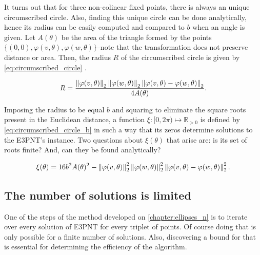 It turns out that for three non-colinear fixed points, there is always an unique circumscribed circle. Also, finding this unique circle can be done analytically, hence its radius can be easily computed and compared to $b$ when an angle is given.
Let $A(\theta)$ be the area of the triangle formed by the points $\{(0, 0), \varphi(v, \theta), \varphi(w, \theta)\}$--note that the transformation does not preserve distance or area. Then, the radius $R$ of the circumscribed circle is given by \autoref{eq:circumscribed_circle} \cite[p.~189]{johnson1960}.

\begin{equation}\label{eq:circumscribed_circle}
R = \dfrac{\left\lVert\varphi(v, \theta)\right\rVert_{2}\left\lVert\varphi(w, \theta)\right\rVert_{2}\left\lVert\varphi(v, \theta)-\varphi(w, \theta)\right\rVert_{2}   }{4A(\theta)}.
\end{equation}

Imposing the radius to be equal $b$ and squaring to eliminate the square roots present in the Euclidean distance, a function $\xi : [0, 2\pi) \mapsto \mathbb{R}_{>0}$ is defined by \autoref{eq:circumscribed_circle_b} in such a way that its zeros determine solutions to the E3PNT's instance. Two questions about $\xi(\theta)$ that arise are: is its set of roots finite? And, can they be found analytically?

\begin{equation}\label{eq:circumscribed_circle_b}
\xi(\theta) = 16b^2A(\theta)^2 - \left\lVert\varphi(v, \theta)\right\rVert_{2}^2\left\lVert\varphi(w, \theta)\right\rVert_{2}^2\left\lVert\varphi(v, \theta)-\varphi(w, \theta)\right\rVert_{2}^2.
\end{equation}

\subsection{The number of solutions is limited}

One of the steps of the method developed on \autoref{chapter:ellipses_n} is to iterate over every solution of E3PNT for every triplet of points. Of course doing that is only possible for a finite number of solutions. Also, discovering a bound for that is essential for determining the efficiency of the algorithm.

